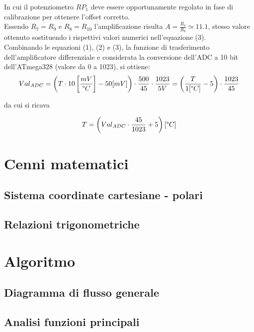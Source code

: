 \documentclass[12pt]{article}
\begin{document}
        In cui il potenziometro $RP_1$ deve essere opportunamente regolato in fase di calibrazione per ottenere l'offset corretto.\\
        Essendo $R_7=R_9$ e $R_8=R_{10}$ l'amplificazione risulta $A = \frac{R_7}{R_8} \simeq 11.1$, stesso valore ottenuto sostituendo i rispettivi valori numerici nell'equazione (3).\\
        Combinando le equazioni (1), (2) e (3), la funzione di trasferimento dell'amplificatore differenziale e considerata la conversione dell'ADC a 10 bit dell'ATmega328 (valore da 0 a 1023), si ottiene:
        \begin{equation}
            Val_{ADC} = \left( T \cdot 10 \left[ \frac{mV}{\degree C} \right] - 50 [mV] \right) \cdot \frac{500}{45} \cdot \frac{1023}{5V} = \left( \frac{T}{1 [\degree C]} - 5 \right) \cdot  \frac{1023}{45}
        \end{equation}
        
        \noindent
        da cui si ricava
        
        \begin{equation}
            T = \left( Val_{ADC} \cdot \frac{45}{1023} + 5 \right) [\degree C]
        \end{equation}
    
\vspace{1cm}

\section{Cenni matematici}
    \subsection{Sistema coordinate cartesiane - polari}
    \subsection{Relazioni trigonometriche}

\section{Algoritmo}
    \subsection{Diagramma di flusso generale}

    \subsection{Analisi funzioni principali}
\end{document}
